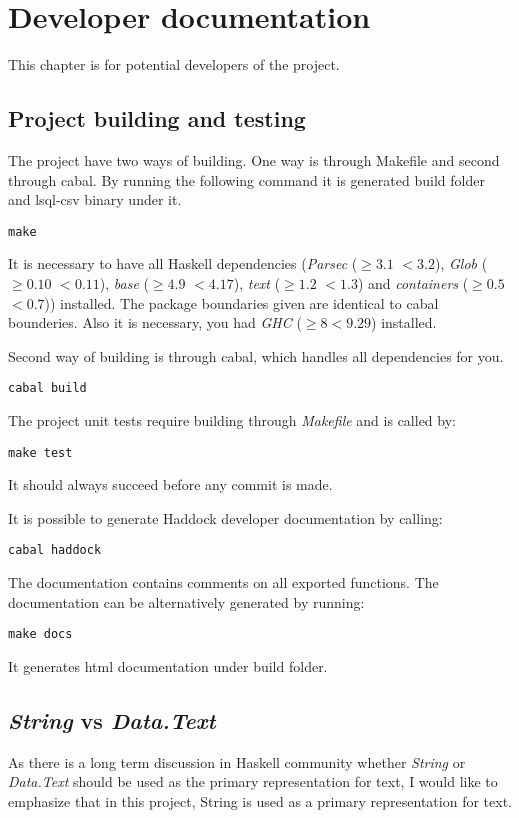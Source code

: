 \chapter{Developer documentation}
This chapter is for potential developers of the project.

\section{Project building and testing}
The project have two ways of building. One way is through Makefile and second through cabal. 
By running the following command it is generated build folder and lsql-csv binary under it.
\begin{verbatim}
make
\end{verbatim}
 
It is necessary to have all Haskell dependencies (\textit{Parsec} ($\geq 3.1$ $<3.2$), \textit{Glob} ($\geq 0.10$ $<0.11$), 
\textit{base} ($\geq 4.9$ $<4.17$), \textit{text} ($\geq 1.2$ $<1.3$) and \textit{containers} ($\geq 0.5$ $<0.7$)) installed.
The package boundaries given are identical to cabal bounderies. Also it is necessary, you had \textit{GHC} ($\geq 8 <9.29$) installed.

Second way of building is through cabal, which handles all dependencies for you.

\begin{verbatim}
cabal build
\end{verbatim}


The project unit tests require building through \textit{Makefile} and is called by:
\begin{verbatim}
make test
\end{verbatim}
It should always succeed before any commit is made.

It is possible to generate Haddock developer documentation by calling:

\begin{verbatim}
cabal haddock
\end{verbatim}

The documentation contains comments on all exported functions. The documentation can be alternatively generated
by running:

\begin{verbatim}
make docs
\end{verbatim}

It generates html documentation under build folder.

\section{\textit{String} vs \textit{Data.Text}}
As there is a long term discussion in Haskell community whether \textit{String} or \textit{Data.Text} should be used as the 
primary representation for text, I would like to emphasize that in this project, String is used as a primary
representation for text.

